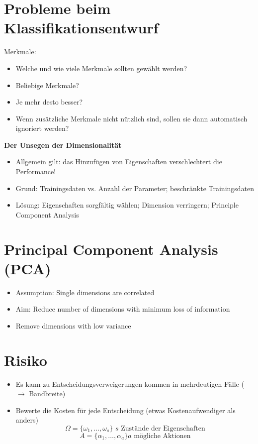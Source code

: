\section{Probleme beim Klassifikationsentwurf}

Merkmale:
\begin{itemize}
\item Welche und wie viele Merkmale sollten gewählt werden?
\item Beliebige Merkmale?
\item Je mehr desto besser?
\item Wenn zusätzliche Merkmale nicht nützlich sind, sollen sie dann automatisch ignoriert werden?
\end{itemize}
\textbf{Der Unsegen der Dimensionalität}
\begin{itemize}
\item Allgemein gilt: das Hinzufügen von Eigenschaften verschlechtert die Performance!
\item Grund: Trainingsdaten vs. Anzahl der Parameter; beschränkte Trainingsdaten
\item Lösung: Eigenschaften sorgfältig wählen; Dimension verringern; Principle Component Analysis
\end{itemize}

\section{Principal Component Analysis (PCA)}
\begin{itemize}
	\item Assumption: Single dimensions are correlated
	\item Aim: Reduce number of dimensions with minimum loss of information
	\item Remove dimensions with low variance
\end{itemize}

\section{Risiko}

\begin{itemize}
\item Es kann zu Entscheidungsverweigerungen kommen in mehrdeutigen Fälle ($\to$ Bandbreite)
\item Bewerte die Kosten für jede Entscheidung (etwas Kostenaufwendiger als anders) $$\Omega = \{ \omega_1, \dots, \omega_s \} \,\, s \textrm{ Zustände der Eigenschaften}$$ $$A = \{ \alpha_1, \dots, \alpha_a \} a \textrm{ mögliche Aktionen}$$
\end{itemize}

